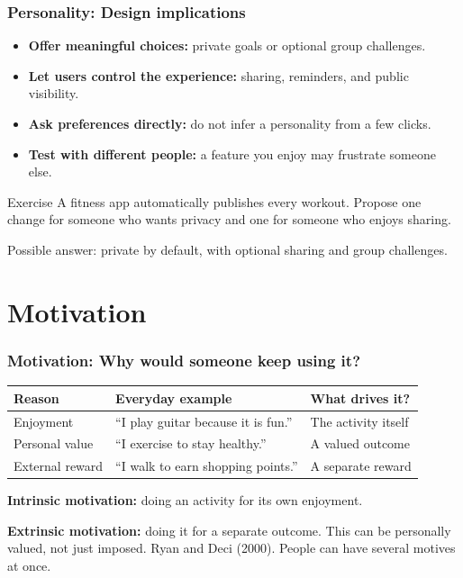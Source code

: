 \documentclass{beamer}
\begin{document}
\begin{frame}
\frametitle{Personality: Design implications}
\small
\begin{itemize}
\item \textbf{Offer meaningful choices:} private goals or optional group challenges.
\item \textbf{Let users control the experience:} sharing, reminders, and public visibility.
\item \textbf{Ask preferences directly:} do not infer a personality from a few clicks.
\item \textbf{Test with different people:} a feature you enjoy may frustrate someone else.
\end{itemize}
\begin{block}{Exercise}
A fitness app automatically publishes every workout. Propose one change for someone who wants privacy and one for someone who enjoys sharing.
\end{block}
{\footnotesize Possible answer: private by default, with optional sharing and group challenges.}
\end{frame}

\section{Motivation}

\begin{frame}
\frametitle{Motivation: Why would someone keep using it?}
\small
\renewcommand{\arraystretch}{1.4}
\begin{tabular}{@{}p{2.1cm}p{4.2cm}p{3cm}@{}}
\toprule
\textbf{Reason} & \textbf{Everyday example} & \textbf{What drives it?}\\
\midrule
Enjoyment & ``I play guitar because it is fun.'' & The activity itself\\
Personal value & ``I exercise to stay healthy.'' & A valued outcome\\
External reward & ``I walk to earn shopping points.'' & A separate reward\\
\bottomrule
\end{tabular}
\medskip

\textbf{Intrinsic motivation:} doing an activity for its own enjoyment.
\medskip

\textbf{Extrinsic motivation:} doing it for a separate outcome. This can be personally valued, not just imposed.
\vfill
{\tiny Ryan and Deci (2000). People can have several motives at once.}
\end{frame}
\end{document}
